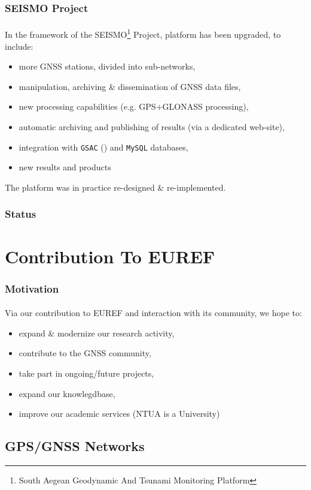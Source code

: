 \documentclass{beamer}
\begin{document}
\begin{frame}\frametitle{SEISMO Project}\framesubtitle{}
  In the framework of the SEISMO\footnote{South Aegean Geodynamic And Tsunami Monitoring Platform} Project, platform has been upgraded,
  to include:

  \begin{itemize}
    \item more GNSS stations, divided into sub-networks,
    \item manipulation, archiving \& dissemination of GNSS data files,
    \item new processing capabilities (e.g. GPS+GLONASS processing),
    \item automatic archiving and publishing of results (via a dedicated web-site),
    \item integration with \texttt{GSAC} (\cite{gsac}) and \texttt{MySQL} databases,
    \item new results and products
  \end{itemize}

  The platform was in practice re-designed \& re-implemented.

\end{frame}

\begin{frame}\frametitle{Status}\framesubtitle{}
\end{frame}

\section{Contribution To EUREF}

\begin{frame}\frametitle{Motivation}\framesubtitle{}
  Via our contribution to EUREF and interaction with its community, we hope to:
  \begin{itemize}
    \item expand \& modernize our research activity,
    \item contribute to the GNSS community,
    \item take part in ongoing/future projects,
    \item expand our knowlegdbase,
    \item improve our academic services (NTUA is a University)
  \end{itemize}
\end{frame}

\subsection{GPS/GNSS Networks}
\end{document}
